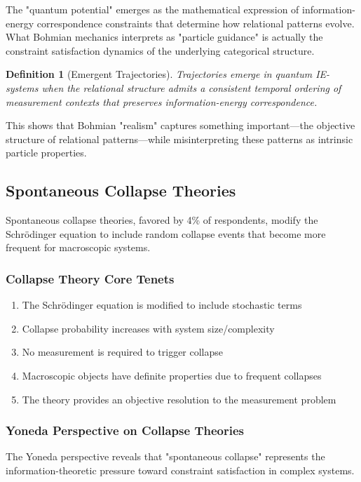 \documentclass[12pt,a4paper]{article}
\newtheorem{definition}[theorem]{Definition}
\begin{document}
The "quantum potential" emerges as the mathematical expression of information-energy correspondence constraints that determine how relational patterns evolve. What Bohmian mechanics interprets as "particle guidance" is actually the constraint satisfaction dynamics of the underlying categorical structure.

\begin{definition}[Emergent Trajectories]
Trajectories emerge in quantum IE-systems when the relational structure admits a consistent temporal ordering of measurement contexts that preserves information-energy correspondence.
\end{definition}

This shows that Bohmian "realism" captures something important—the objective structure of relational patterns—while misinterpreting these patterns as intrinsic particle properties.

\subsection{Spontaneous Collapse Theories}

Spontaneous collapse theories, favored by 4\% of respondents, modify the Schrödinger equation to include random collapse events that become more frequent for macroscopic systems.

\subsubsection{Collapse Theory Core Tenets}
\begin{enumerate}
\item The Schrödinger equation is modified to include stochastic terms
\item Collapse probability increases with system size/complexity
\item No measurement is required to trigger collapse
\item Macroscopic objects have definite properties due to frequent collapses
\item The theory provides an objective resolution to the measurement problem
\end{enumerate}

\subsubsection{Yoneda Perspective on Collapse Theories}

The Yoneda perspective reveals that "spontaneous collapse" represents the information-theoretic pressure toward constraint satisfaction in complex systems.
\end{document}
